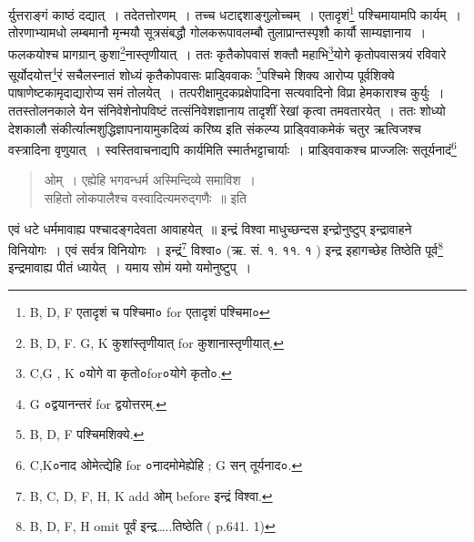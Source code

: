 \documentclass[11pt, openany]{book}
\begin{document}
\newpage


\noindent
र्युत्तराङ्गं काष्ठं दद्यात्~। तदेतत्तोरणम्~। तच्च धटाद्दशाङ्गुलोच्चम्~। एतादृशं\renewcommand{\thefootnote}{1}\footnote{B, D, F एतादृशं च पश्चिमा० for एतादृशं पश्चिमा०} पश्चिमायामपि कार्यम्~। तोरणाभ्यामधो लम्बमानौ मृन्मयौ सूत्रसंबद्धौ गोलकरूपावलम्बौ तुलाप्रान्तस्पृशौ कार्यौ साम्यज्ञानाय~। फलकयोश्च प्रागग्रान् कुशा\renewcommand{\thefootnote}{2}\footnote{B, D, F. G, K कुशांस्तृणीयात् for कुशानास्तृणीयात्.}नास्तृणीयात्~। ततः कृतैकोपवासं शक्तौ महाभि\renewcommand{\thefootnote}{3}\footnote{C,G , K ०योगे वा कृतो०for०योगे कृतो०.}योगे कृतोपवासत्रयं रविवारे सूर्योदयोत्त\renewcommand{\thefootnote}{4}\footnote{G ०द्वयानन्तरं for द्वयोत्तरम्.}रं सचैलस्नातं शोध्यं कृतैकोपवासः प्राड्विवाकः \renewcommand{\thefootnote}{5}\footnote{B, D, F पश्चिमशिक्ये.}पश्चिमे शिक्य आरोप्य पूर्वशिक्ये पाषाणेष्टकामृदाद्यारोप्य समं तोलयेत्~। तत्परीक्षामुदकप्रक्षेपादिना सत्यवादिनो विप्रा हेमकाराश्च कुर्युः~। ततस्तोलनकाले येन संनिवेशेनोपविष्टं तत्संनिवेशज्ञानाय तादृशीं रेखां कृत्वा तमवतारयेत्~। ततः शोध्यो देशकालौ संकीर्त्यात्मशुद्धिज्ञापनायामुकदिव्यं करिष्य इति संकल्प्य प्राड्विवाकमेकं चतुर ऋत्विजश्च वस्त्रादिना वृणुयात्~। स्वस्तिवाचनाद्यपि कार्यमिति स्मार्तभट्टाचार्याः~। प्राड्विवाकश्च प्राज्जलिः सतूर्यनादं\renewcommand{\thefootnote}{6}\footnote{C,K०नाद ओमेत्द्येहि for ०नादमोमेह्येहि ; G सन् तूर्यनाद०.}

\begin{quote}
{\vy ओम्~। एह्येहि भगवन्धर्म अस्मिन्दिव्ये समाविश~।\\
सहितो लोकपालैश्च वस्वादित्यमरुद्गणैः~॥} इति
\end{quote}

एवं धटे धर्ममावाह्य पश्चादङ्गदेवता आवाहयेत्~॥ इन्द्रं विश्वा माधुच्छन्दस इन्द्रोनुष्टुप् इन्द्रावाहने विनियोगः~। एवं सर्वत्र विनियोगः~। इन्द्रं\renewcommand{\thefootnote}{7}\footnote{B, C, D, F, H, K add ओम् before इन्द्रं विश्वा.} विश्वा० (ऋ. सं. १. ११. १ ) इन्द्र इहागच्छेह तिष्ठेति पूर्व\renewcommand{\thefootnote}{8}\footnote{B, D, F, H omit पूर्वं इन्द्र\ldots..तिष्ठेति ( p.641. 1)} इन्द्रमावाह्य पीतं ध्यायेत्~। यमाय सोमं यमो यमोनुष्टुप्~।

\newpage
\end{document}
